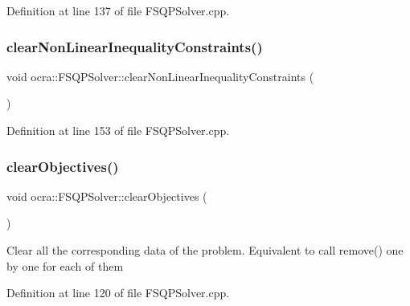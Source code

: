 Definition at line 137 of file F\+S\+Q\+P\+Solver.\+cpp.

\hypertarget{classocra_1_1FSQPSolver_a873b6761f0cf4efd61ba3bc04cc88897}{}\label{classocra_1_1FSQPSolver_a873b6761f0cf4efd61ba3bc04cc88897} 
\subsubsection{\texorpdfstring{clear\+Non\+Linear\+Inequality\+Constraints()}{clearNonLinearInequalityConstraints()}}
{\footnotesize\ttfamily void ocra\+::\+F\+S\+Q\+P\+Solver\+::clear\+Non\+Linear\+Inequality\+Constraints (\begin{DoxyParamCaption}{ }\end{DoxyParamCaption})}



Definition at line 153 of file F\+S\+Q\+P\+Solver.\+cpp.

\hypertarget{classocra_1_1FSQPSolver_a7ee778eb0dc102d86d119dcb852f0cfd}{}\label{classocra_1_1FSQPSolver_a7ee778eb0dc102d86d119dcb852f0cfd} 
\subsubsection{\texorpdfstring{clear\+Objectives()}{clearObjectives()}}
{\footnotesize\ttfamily void ocra\+::\+F\+S\+Q\+P\+Solver\+::clear\+Objectives (\begin{DoxyParamCaption}{ }\end{DoxyParamCaption})}

Clear all the corresponding data of the problem. Equivalent to call remove() one by one for each of them 

Definition at line 120 of file F\+S\+Q\+P\+Solver.\+cpp.

\hypertarget{classocra_1_1FSQPSolver_ae989c0c32f87ea5e4e5a85e11683fcff}{}\label{classocra_1_1FSQPSolver_ae989c0c32f87ea5e4e5a85e11683fcff} 
